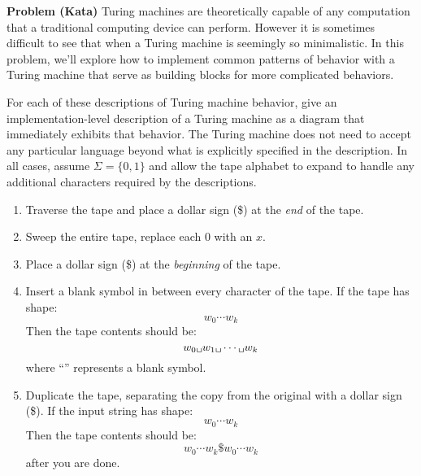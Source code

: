 \documentclass[12pt]{article}
\newcounter{ProblemCounter}
\newenvironment{problem}[1][]
  {\refstepcounter{ProblemCounter}\noindent\textbf{Problem \theProblemCounter{} (#1)}\quad}
  {\newpage}
\begin{document}

\begin{problem}[Kata]
  Turing machines are theoretically capable of any computation that a
  traditional computing device can perform.  However it is sometimes difficult
  to see that when a Turing machine is seemingly so minimalistic.  In this
  problem, we'll explore how to implement common patterns of behavior with a
  Turing machine that serve as building blocks for more complicated behaviors.

  For each of these descriptions of Turing machine behavior, give an
  implementation-level description of a Turing machine as a diagram that
  immediately exhibits that behavior.  The Turing machine does not need to
  accept any particular language beyond what is explicitly specified in the
  description.  In all cases, assume \( \Sigma = \{ 0, 1 \} \) and allow the
  tape alphabet to expand to handle any additional characters required by the
  descriptions.
  \begin{enumerate}[itemsep=0pt, label=(\alph*)]
    \item Traverse the tape and place a dollar sign (\$) at the \emph{end} of the tape.
    \item Sweep the entire tape, replace each $0$ with an $x$.
    \item Place a dollar sign (\$) at the \emph{beginning} of the tape.
    \item Insert a blank symbol in between every character of the tape.  If the
      tape has shape:
      \[
        w_0 \cdots w_k
      \]
      Then the tape contents should be:
      \[
        w_0\texttt{\textvisiblespace}w_1\texttt{\textvisiblespace}\cdots\texttt{\textvisiblespace}w_k
      \]
      where ``\texttt{\textvisiblespace}'' represents a blank symbol.
    \item Duplicate the tape, separating the copy from the original with a
      dollar sign (\$).  If the input string has shape:
      \[
        w_0 \cdots w_k
      \]
      Then the tape contents should be:
      \[
        w_0 \cdots w_k \$ w_0 \cdots w_k
      \]
      after you are done.
  \end{enumerate}


\end{problem}

\end{document}
